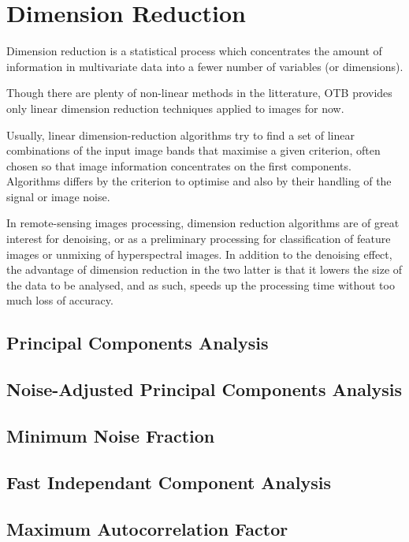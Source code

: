 \chapter{Dimension Reduction}\label{chap:dimred}

Dimension reduction is a statistical process which concentrates the
amount of information in multivariate data into a fewer number of
variables (or dimensions).

Though there are plenty of non-linear methods in the litterature, OTB
provides only linear dimension reduction techniques applied to images for now.

Usually, linear dimension-reduction algorithms try to find a set of
linear combinations of the input image bands that maximise a given
criterion, often chosen so that image information concentrates on the
first components. Algorithms differs by the criterion to optimise and
also by their handling of the signal or image noise.

In remote-sensing images processing, dimension reduction algorithms
are of great interest for denoising, or as a preliminary processing
for classification of feature images or unmixing of hyperspectral
images. In addition to the denoising effect, the advantage of
dimension reduction in the two latter is that it lowers the size of
the data to be analysed, and as such, speeds up the processing time
without too much loss of accuracy.

\section{Principal Components Analysis}



\section{Noise-Adjusted Principal Components Analysis}



\section{Minimum Noise Fraction}



\section{Fast Independant Component Analysis}



\section{Maximum Autocorrelation Factor}




